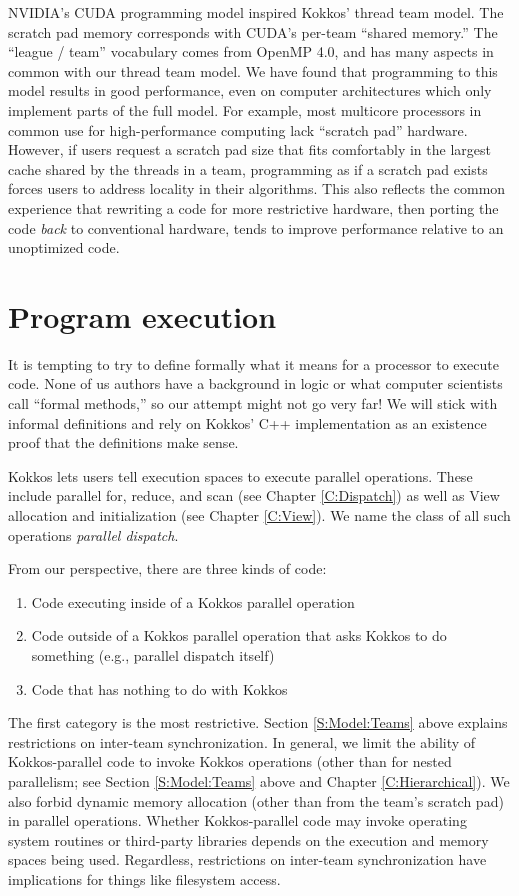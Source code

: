 NVIDIA's CUDA programming model inspired Kokkos' thread team model.
The scratch pad memory corresponds with CUDA's per-team ``shared memory.''
The ``league / team'' vocabulary comes from OpenMP 4.0,
and has many aspects in common with our thread team model.
We have found that programming to this model results in good performance,
even on computer architectures which only implement parts of the full model.
For example, most multicore processors in common use for high-performance computing lack ``scratch pad'' hardware.
However, if users request a scratch pad size that fits comfortably in the largest cache shared by the threads in a team,
programming as if a scratch pad exists forces users to address locality in their algorithms.
This also reflects the common experience that rewriting a code for more restrictive hardware,
then porting the code \emph{back} to conventional hardware,
tends to improve performance relative to an unoptimized code.

\section{Program execution}\label{S:Model:Exec}

It is tempting to try to define formally what it means for a processor to execute code.
None of us authors have a background in logic or what computer scientists call ``formal methods,''
so our attempt might not go very far!
We will stick with informal definitions and rely on Kokkos' C++ implementation
as an existence proof that the definitions make sense.

Kokkos lets users tell execution spaces to execute parallel operations.
These include parallel for, reduce, and scan (see Chapter \ref{C:Dispatch})
as well as View allocation and initialization (see Chapter \ref{C:View}).
We name the class of all such operations \emph{parallel dispatch}.

From our perspective, there are three kinds of code:
\begin{enumerate}
\item Code executing inside of a Kokkos parallel operation
\item Code outside of a Kokkos parallel operation that asks Kokkos to
  do something (e.g., parallel dispatch itself)
\item Code that has nothing to do with Kokkos
\end{enumerate}
The first category is the most restrictive.
Section \ref{S:Model:Teams} above explains restrictions on inter-team synchronization.
In general, we limit the ability of Kokkos-parallel code to invoke Kokkos operations
(other than for nested parallelism; 
see Section \ref{S:Model:Teams} above and Chapter \ref{C:Hierarchical}).
We also forbid dynamic memory allocation (other than from the team's scratch pad) in parallel operations.
Whether Kokkos-parallel code may invoke operating system routines or third-party libraries
depends on the execution and memory spaces being used.
Regardless, restrictions on inter-team synchronization have implications for things like filesystem access.

